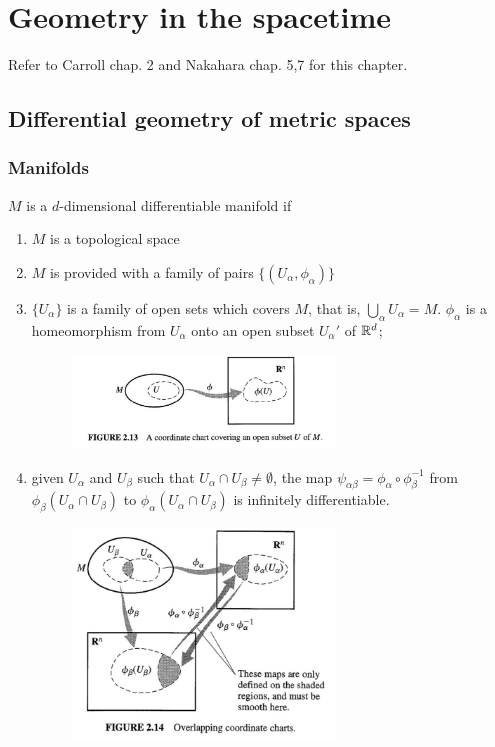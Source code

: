 \documentclass[../main/main.tex]{subfiles}
\begin{document}
\chapter{Geometry in the spacetime}
Refer to \textsf{Carroll chap. 2} and \textsf{Nakahara chap. 5,7} for this chapter.\\

\section{Differential geometry of metric spaces}

\subsection{Manifolds}

\begin{definition}{}
$M$ is a $d$-dimensional differentiable manifold if
\begin{enumerate}
\item $M$ is a topological space
\item $M$ is provided with a family of pairs $\{(U_\alpha, \phi_\alpha)\}$
\item $\{U_\alpha\}$ is a family of open sets which covers $M$, that is,  $\bigcup_\alpha U_\alpha=M$. $\phi_\alpha$ is a homeomorphism from $U_\alpha$ onto an open subset $U_\alpha'$ of $\mathbb{R}^d$;  
\begin{figure}[H]
\centering
\includegraphics[width=7cm]{../img/chart-diff-geo.jpg}
\end{figure}
\item given $U_\alpha$ and $U_\beta$ such that $U_\alpha\cap U_\beta\neq\emptyset$, the map $\psi_{\alpha\beta}=\phi_\alpha\circ\phi_\beta^{-1}$ from $\phi_\beta(U_\alpha\cap U_\beta)$ to $\phi_\alpha(U_\alpha\cap U_\beta)$ is infinitely differentiable.
\begin{figure}[H]
\centering
\includegraphics[width=7cm]{../img/compatible-chart-diff-geo.jpg}

\end{figure}
\end{enumerate}
\end{definition}
\end{document}
